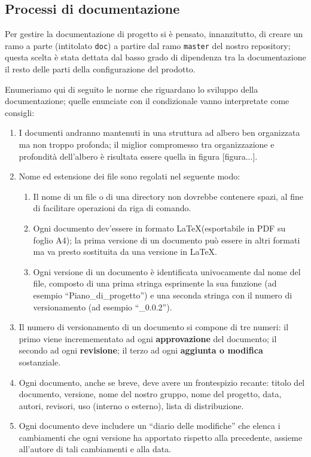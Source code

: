 \subsection{Processi di documentazione}
Per gestire la documentazione di progetto si è pensato, innanzitutto, di creare un ramo a parte (intitolato \texttt{doc}) a partire dal ramo \texttt{master} del nostro repository; questa scelta è stata dettata dal basso grado di dipendenza tra la documentazione il resto delle parti della configurazione del prodotto.

Enumeriamo qui di seguito le norme che riguardano lo sviluppo della documentazione; quelle enunciate con il condizionale vanno interpretate come consigli:
\begin{enumerate}
	\item I documenti andranno mantenuti in una struttura ad albero ben organizzata ma non troppo profonda; il miglior compromesso tra organizzazione e profondità dell'albero è risultata essere quella in figura [figura...].
	\item Nome ed estensione dei file sono regolati nel seguente modo:
	\begin{enumerate}
		\item Il nome di un file o di una directory non dovrebbe contenere spazi, al fine di facilitare operazioni da riga di comando.
		\item Ogni documento dev'essere in formato \LaTeX (esportabile in PDF su foglio A4); la prima versione di un documento può essere in altri formati ma va presto sostituita da una versione in \LaTeX.
		\item Ogni versione di un documento è identificata univocamente dal nome del file, composto di una prima stringa esprimente la sua funzione (ad esempio “Piano\_di\_progetto”) e una seconda stringa con il numero di versionamento (ad esempio “\_0.0.2”).
	\end{enumerate}
	\item Il numero di versionamento di un documento si compone di tre numeri: il primo viene incremementato ad ogni \textbf{approvazione} del documento; il secondo ad ogni \textbf{revisione}; il terzo ad ogni \textbf{aggiunta o modifica} sostanziale.
	\item Ogni documento, anche se breve, deve avere un frontespizio recante: titolo del documento, versione, nome del nostro gruppo, nome del progetto, data, autori, revisori, uso (interno o esterno), lista di distribuzione. %
	\item Ogni documento deve includere un “diario delle modifiche” che elenca i cambiamenti che ogni versione ha apportato rispetto alla precedente, assieme all'autore di tali cambiamenti e alla data.

\end{enumerate}
